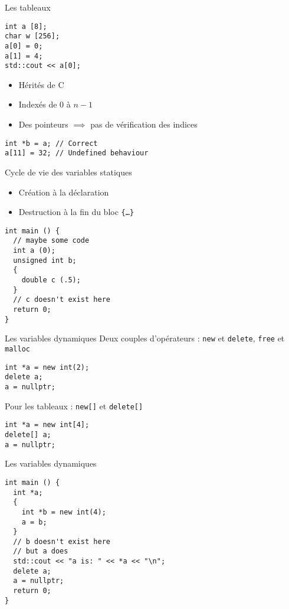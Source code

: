 \begin{frame}[fragile]{Les tableaux}
  \begin{lstlisting}
int a [8];
char w [256];
a[0] = 0;
a[1] = 4;
std::cout << a[0];
  \end{lstlisting}

  \begin{itemize}
  \item Hérités de C
  \item Indexés de 0 à $n-1$
  \item Des pointeurs $\implies$ pas de vérification des indices
  \end{itemize}

  \begin{lstlisting}
int *b = a; // Correct
a[11] = 32; // Undefined behaviour
  \end{lstlisting}  
\end{frame}

\begin{frame}[fragile]{Cycle de vie des variables statiques}
  \begin{itemize}
  \item Création à la déclaration
  \item Destruction à la fin du bloc \texttt{\{\dots\}}
  \end{itemize}

  \begin{lstlisting}
int main () {
  // maybe some code
  int a (0);
  unsigned int b;
  {
    double c (.5);
  }
  // c doesn't exist here
  return 0;
}
  \end{lstlisting}
\end{frame}

\begin{frame}[fragile]{Les variables dynamiques}
  Deux couples d'opérateurs : \texttt{new} et \texttt{delete}, \texttt{free} et \texttt{malloc}
  \begin{lstlisting}
int *a = new int(2);
delete a;
a = nullptr;
  \end{lstlisting}

  Pour les tableaux : \texttt{new[]} et \texttt{delete[]}
  \begin{lstlisting}
int *a = new int[4];
delete[] a;
a = nullptr;
  \end{lstlisting}
\end{frame}

\begin{frame}[fragile]{Les variables dynamiques}
  \begin{lstlisting}
int main () {
  int *a;
  {
    int *b = new int(4);
    a = b;
  }
  // b doesn't exist here
  // but a does
  std::cout << "a is: " << *a << "\n";
  delete a;
  a = nullptr;
  return 0;
}
  \end{lstlisting}
\end{frame}

